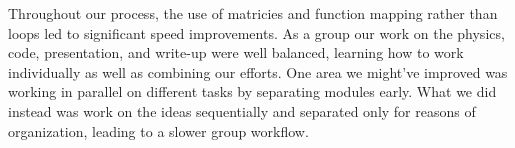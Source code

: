 \documentclass{notes}
\begin{document}
Throughout our process, the use of matricies and function mapping rather than loops led to significant speed improvements. As a group our work on the physics, code, presentation, and write-up were well balanced, learning how to work individually as well as combining our efforts. One area we might've improved was working in parallel on different tasks by separating modules early. What we did instead was work on the ideas sequentially and separated only for reasons of organization, leading to a slower group workflow.

\nocite{*}

\end{document}
